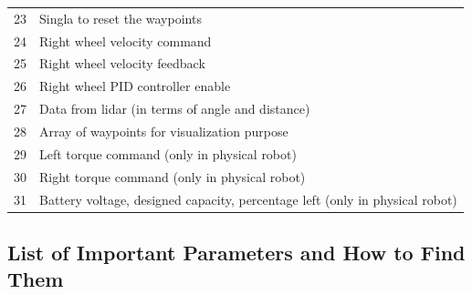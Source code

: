 \documentclass[12]{article}
\begin{document}
\begin{table}[h!]
\begin{center}
\begin{tabular}{c|l}
      23 & Singla to reset the waypoints \\
      24 & Right wheel velocity command \\
      25 & Right wheel velocity feedback \\
      26 & Right wheel PID controller enable \\
      27 & Data from lidar (in terms of angle and distance) \\
      28 & Array of waypoints for visualization purpose \\
      29 & Left torque command (only in physical robot) \\
      30 & Right torque command (only in physical robot) \\
      31 & Battery voltage, designed capacity, percentage left (only in physical robot) \\ 
      \end{tabular}
    \end{center}
  \end{table}

\subsection{List of Important Parameters and How to Find Them}
\end{document}
